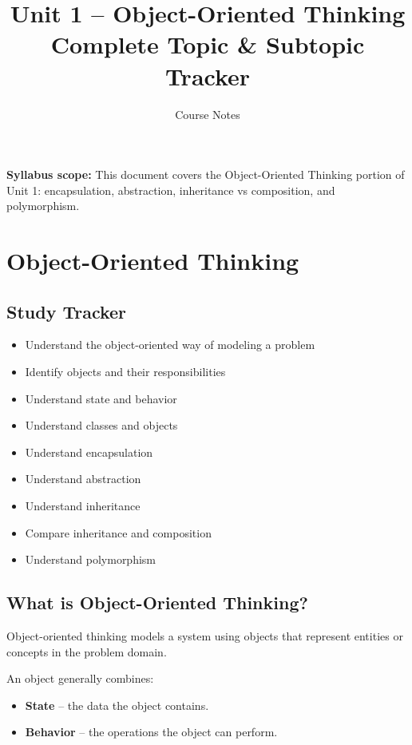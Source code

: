 \documentclass[11pt,a4paper]{article}
\title{\vspace{-1cm}\textbf{Unit 1 -- Object-Oriented Thinking}\\
\large Complete Topic \& Subtopic Tracker}
\author{Course Notes}
\date{}
\newcommand{\checkitem}{$\square$}
\begin{document}
\maketitle

\begin{conceptbox}
\textbf{Syllabus scope:} This document covers the Object-Oriented Thinking
portion of Unit 1: encapsulation, abstraction, inheritance vs composition,
and polymorphism.
\end{conceptbox}

\tableofcontents
\newpage

\section{Object-Oriented Thinking}

\subsection{Study Tracker}

\begin{itemize}[label=\checkitem]
    \item Understand the object-oriented way of modeling a problem
    \item Identify objects and their responsibilities
    \item Understand state and behavior
    \item Understand classes and objects
    \item Understand encapsulation
    \item Understand abstraction
    \item Understand inheritance
    \item Compare inheritance and composition
    \item Understand polymorphism
\end{itemize}

\subsection{What is Object-Oriented Thinking?}

Object-oriented thinking models a system using objects that represent
entities or concepts in the problem domain.

An object generally combines:

\begin{itemize}
    \item \textbf{State} -- the data the object contains.
    \item \textbf{Behavior} -- the operations the object can perform.
\end{itemize}
\end{document}
